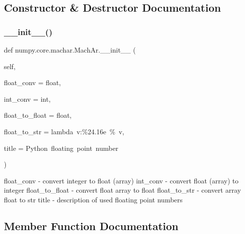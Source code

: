 \subsection{Constructor \& Destructor Documentation}
\mbox{\label{classnumpy_1_1core_1_1machar_1_1MachAr_ad3f3270ef2fb030daff0eb2d62035b9c}} 
\subsubsection{\texorpdfstring{\+\_\+\+\_\+init\+\_\+\+\_\+()}{\_\_init\_\_()}}
{\footnotesize\ttfamily def numpy.\+core.\+machar.\+Mach\+Ar.\+\_\+\+\_\+init\+\_\+\+\_\+ (\begin{DoxyParamCaption}\item[{}]{self,  }\item[{}]{float\+\_\+conv = {\ttfamily float},  }\item[{}]{int\+\_\+conv = {\ttfamily int},  }\item[{}]{float\+\_\+to\+\_\+float = {\ttfamily float},  }\item[{}]{float\+\_\+to\+\_\+str = {\ttfamily lambda~v\+:\textquotesingle{}\%24.16e\textquotesingle{}~\%~v},  }\item[{}]{title = {\ttfamily \textquotesingle{}Python~floating~point~number\textquotesingle{}} }\end{DoxyParamCaption})}

\begin{DoxyVerb}float_conv - convert integer to float (array)
int_conv   - convert float (array) to integer
float_to_float - convert float array to float
float_to_str - convert array float to str
title        - description of used floating point numbers\end{DoxyVerb}
 

\subsection{Member Function Documentation}
\mbox{\label{classnumpy_1_1core_1_1machar_1_1MachAr_ae44e82521e9853322f77dfd256ca2a1f}} 
